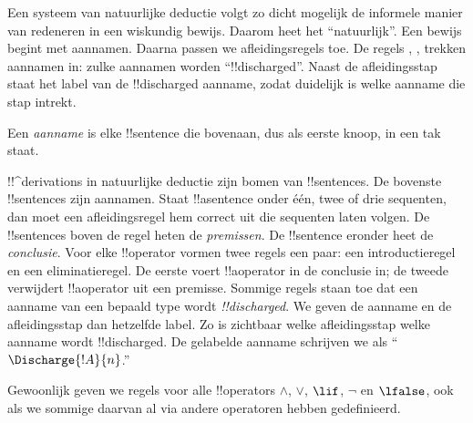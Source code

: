 \documentclass[../../../include/open-logic-section]{subfiles}
\begin{document}
      {}
      {}


\begin{explain}
Een systeem van natuurlijke deductie volgt zo dicht mogelijk de
informele manier van redeneren in een wiskundig bewijs. Daarom heet
het ``natuurlijk''. Een bewijs begint met aannamen. Daarna passen we
afleidingsregels toe. De regels \Intro{\lnot}, \Intro{\lif},
 trekken
aannamen in: zulke aannamen worden ``!!{discharged}''. Naast de
afleidingsstap staat het label van de !!{discharged} aanname, zodat
duidelijk is welke aanname die stap intrekt.
\end{explain}

\begin{defn}[Aanname]
Een \emph{aanname} is elke !!{sentence} die bovenaan, dus als eerste
knoop, in een tak staat.
\end{defn}

!!^{derivation}s in natuurlijke deductie zijn bomen van
!!{sentence}s. De bovenste !!{sentence}s zijn aannamen. Staat
!!a{sentence} onder
één, twee of drie sequenten, dan moet een afleidingsregel hem correct
uit die sequenten laten volgen. De !!{sentence}s boven de regel heten
de \emph{premissen}. De !!{sentence} eronder heet de
\emph{conclusie}. Voor elke !!{operator} vormen twee regels een paar:
een introductieregel en een eliminatieregel. De eerste voert
!!a{operator} in de conclusie in; de tweede verwijdert !!a{operator}
uit een premisse. Sommige regels staan toe dat een aanname van een
bepaald type wordt \emph{!!{discharged}}. We geven de aanname en de
afleidingsstap dan hetzelfde label. Zo is zichtbaar welke
afleidingsstap welke aanname wordt !!{discharged}. De gelabelde aanname
schrijven we als ``$\Discharge{!A}{n}$.''


%
	{Gewoonlijk geven we regels voor alle !!{operator}s $\land$, $\lor$, $\lif$, $\lnot$ en $\lfalse$, ook als we sommige daarvan al via andere operatoren hebben gedefinieerd.}
\end{document}
